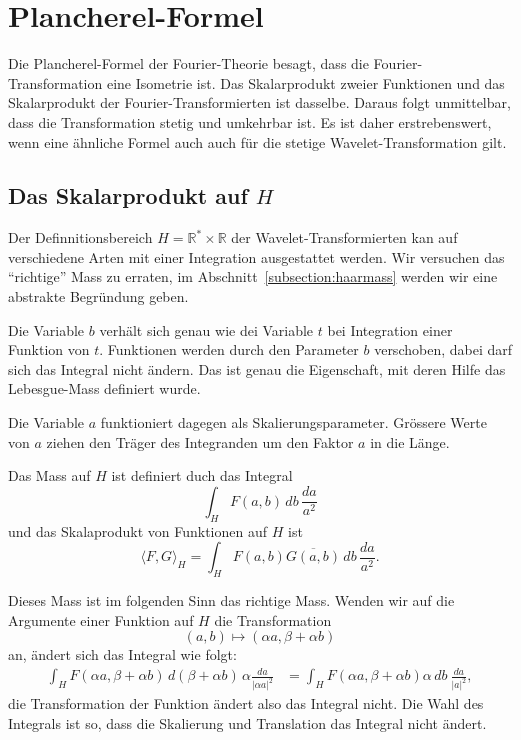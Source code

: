 %
%
%
\section{Plancherel-Formel%
\label{section:cwt:plancherel}}
Die Plancherel-Formel der Fourier-Theorie besagt, dass die
Fourier-Transformation eine Isometrie ist.
Das Skalarprodukt zweier Funktionen und das Skalarprodukt der
Fourier-Transformierten ist dasselbe.
Daraus folgt unmittelbar, dass die Transformation stetig und
umkehrbar ist.
Es ist daher erstrebenswert, wenn eine ähnliche Formel auch
auch für die stetige Wavelet-Transformation gilt.

\subsection{Das Skalarprodukt auf $H$}
Der Definnitionsbereich $H=\mathbb R^* \times \mathbb R$ der
Wavelet-Transformierten kan auf verschiedene Arten mit einer Integration
ausgestattet werden.
Wir versuchen das ``richtige'' Mass zu erraten, im
Abschnitt~\ref{subsection:haarmass} werden wir eine abstrakte Begründung
geben.

Die Variable $b$ verhält sich genau wie dei Variable $t$ bei Integration
einer Funktion von $t$.
Funktionen werden durch den Parameter $b$ verschoben, dabei darf sich
das Integral nicht ändern.
Das ist genau die Eigenschaft, mit deren Hilfe das Lebesgue-Mass
definiert wurde.

Die Variable $a$ funktioniert dagegen als Skalierungsparameter.
Grössere Werte von $a$ ziehen den Träger des Integranden um den Faktor $a$ 
in die Länge.

\begin{definition}
Das Mass auf $H$ ist definiert duch das Integral
\[
\int_H F(a,b)\,db \,\frac{da}{a^2}
\]
und das Skalaprodukt von Funktionen auf $H$ ist
\[
\langle F,G\rangle_H
=
\int_{H} F(a,b)\overline{G(a,b)}\,db \,\frac{da}{a^2}.
\]
\end{definition}

Dieses Mass ist im folgenden Sinn das richtige Mass.
Wenden wir auf die Argumente einer Funktion auf $H$ die Transformation
\[
(a,b) \mapsto (\alpha a, \beta + \alpha b)
\]
an, ändert sich das Integral wie folgt:
\begin{align*}
\int_H F(\alpha a,\beta + \alpha b)\,d(\beta + \alpha b)\,\alpha\frac{da}{|\alpha a|^2}
&=
\int_H F(\alpha a,\beta + \alpha b) \alpha\,db \ \frac{da}{|a|^2},
\end{align*}
die Transformation der Funktion ändert also das Integral nicht.
Die Wahl des Integrals ist so, dass die Skalierung und Translation
das Integral nicht ändert.

